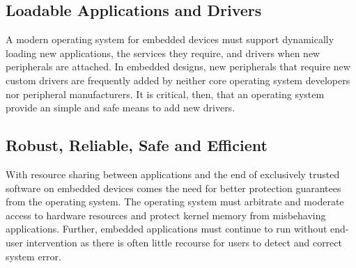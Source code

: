 \subsection{Loadable Applications and Drivers}

A modern operating system for embedded devices must support dynamically
loading new applications, the services they require, and drivers when new
peripherals are attached.
In embedded designs, new peripherals that require new custom drivers are
frequently added by neither core operating system developers nor peripheral
manufacturers. It is critical, then, that an operating system provide an
simple and safe means to add new drivers.




\subsection{Robust, Reliable, Safe and Efficient}

With resource sharing between applications and the end of exclusively trusted
software on embedded devices comes the need for better protection guarantees
from the operating system. The operating system must arbitrate and moderate
access to hardware resources and protect kernel memory from misbehaving
applications.  Further, embedded applications must continue to run without
end-user intervention as there is often little recourse for users to detect
and correct system error.



